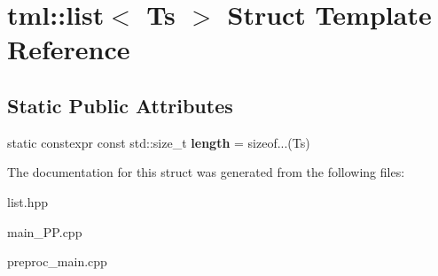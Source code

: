 \hypertarget{structtml_1_1list}{\section{tml\+:\+:list$<$ Ts $>$ Struct Template Reference}
\label{structtml_1_1list}
}
\subsection*{Static Public Attributes}
\begin{DoxyCompactItemize}
\item 
\hypertarget{structtml_1_1list_af291a6dc1ffd8d624bd93ab66e3ab2be}{static constexpr const std\+::size\+\_\+t {\bfseries length} = sizeof...(Ts)}\label{structtml_1_1list_af291a6dc1ffd8d624bd93ab66e3ab2be}

\end{DoxyCompactItemize}


The documentation for this struct was generated from the following files\+:\begin{DoxyCompactItemize}
\item 
list.\+hpp\item 
main\+\_\+\+P\+P.\+cpp\item 
preproc\+\_\+main.\+cpp\end{DoxyCompactItemize}
